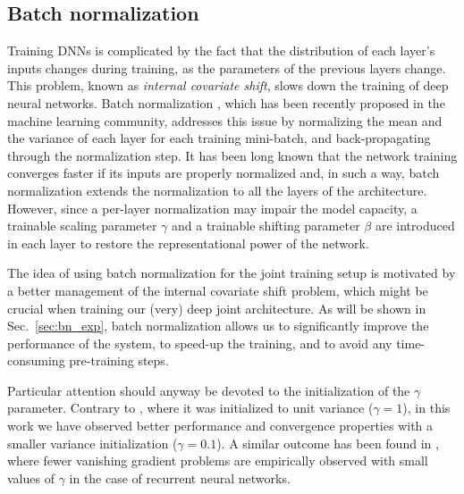 \documentclass{article}
\begin{document}
\subsection{Batch normalization} \label{sec:batchnorm}
Training DNNs is complicated by the fact that the distribution of each layer's inputs changes during training, as the parameters of the previous layers change.
This problem, known as \textit{internal covariate shift}, slows down the training of deep neural networks. 
Batch normalization \cite{batchnorm}, which has been recently proposed in the machine learning community, addresses this issue by  normalizing the mean and the variance of each layer for each training mini-batch, and back-propagating through the normalization step. It has been long known %
that the network training converges faster if its inputs are properly normalized \cite{yann} and, in such a way, batch normalization extends the normalization to all the layers of the architecture. However, since a per-layer normalization may impair the model capacity, a trainable scaling parameter $\gamma$ and a trainable shifting parameter $\beta$  are introduced in each layer to restore the representational power of the network. 

The idea of using batch normalization for the joint training setup is motivated by a better management of the internal covariate shift 
problem, which might be crucial when training our (very) deep joint architecture.
As will be shown in Sec.\ \ref{sec:bn_exp}, batch normalization allows us to significantly improve the performance of the system, to speed-up the training, and to avoid any time-consuming pre-training steps.

Particular attention should anyway be devoted to the initialization of the $\gamma$ parameter. Contrary to \cite{batchnorm}, where it was initialized to unit variance ($\gamma=1$), in this work we have observed better performance and convergence properties with a smaller variance initialization ($\gamma=0.1$).
A similar outcome has been found in \cite{initbn}, where fewer vanishing gradient problems are empirically observed with small values of $\gamma$ in the case of recurrent neural networks.
\end{document}
